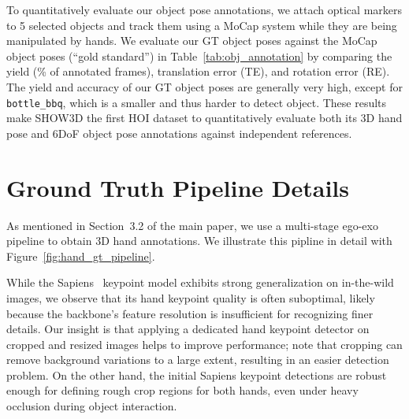 \documentclass[10pt,twocolumn,letterpaper]{article}
\begin{document}
To quantitatively evaluate our object pose annotations, we attach optical markers to 5 selected objects and track them using a MoCap system while they are being manipulated by hands.
We evaluate our GT object poses against the MoCap object poses (``gold standard'') in Table~\ref{tab:obj_annotation} by comparing the yield (\% of annotated frames), translation error (TE), and rotation error (RE).
The yield and accuracy of our GT object poses are generally very high, except for {\small \texttt{bottle\_bbq}}, which is a smaller and thus harder to detect object.
These results make SHOW3D the first HOI dataset to quantitatively evaluate both its 3D hand pose and 6DoF object pose annotations against independent references.
\begin{table}[h]
\footnotesize
\centering
\vspace{-6pt}
\caption{Quantitative evaluation of our ground-truth object annotations against MoCap-derived poses as an independent reference.}
\label{tab:obj_annotation}
\end{table}


\section{Ground Truth Pipeline Details}
As mentioned in Section~3.2 of the main paper, we use a multi-stage ego-exo pipeline to obtain 3D hand annotations. 
We illustrate this pipline in detail with Figure~\ref{fig:hand_gt_pipeline}.

While the Sapiens~\cite{khirodkar2024sapiens} keypoint model exhibits strong generalization on in-the-wild images, we observe that its hand keypoint quality is often suboptimal, likely because the backbone's feature resolution is insufficient for recognizing finer details. 
Our insight is that applying a dedicated hand keypoint detector on cropped and resized images helps to improve performance; note that cropping can remove background variations to a large extent, resulting in an easier detection problem.
On the other hand, the initial Sapiens keypoint detections are robust enough for defining rough crop regions for both hands, even under heavy occlusion during object interaction.
\end{document}
